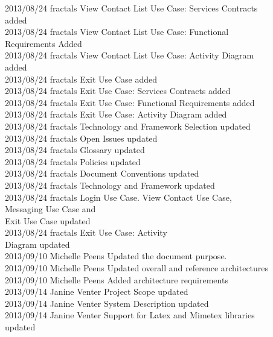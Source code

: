 \documentclass[29pt,a4paper]{moderncv}
\begin{document}
\begin{tabbing}
2013/08/24  \>fractals \> View Contact List Use Case: Services Contracts\\ \> \> \> added\\
2013/08/24  \> fractals \> View Contact List Use Case: Functional\\ \> \> \> Requirements Added\\
2013/08/24  \> fractals \> View Contact List Use Case: Activity Diagram\\ \> \> \> added\\
2013/08/24  \> fractals \> Exit Use Case added\\
2013/08/24  \> fractals \> Exit Use Case: Services Contracts added\\
2013/08/24  \> fractals \> Exit Use Case: Functional Requirements added\\
2013/08/24  \> fractals \> Exit Use Case: Activity Diagram added\\
2013/08/24  \> fractals \> Technology and Framework Selection updated\\
2013/08/24  \> fractals \> Open Issues updated\\
2013/08/24  \> fractals \> Glossary updated\\
2013/08/24  \> fractals \> Policies updated\\
2013/08/24  \> fractals \> Document Conventions updated \\
2013/08/24  \> fractals \> Technology and Framework updated\\
2013/08/24 \> fractals \> Login Use Case. View Contact Use Case,\\ \> \> \> Messaging Use Case and \\ \> \> \> Exit Use Case updated\\
2013/08/24  \> fractals \> Exit Use Case: Activity \\ \> \> \> Diagram updated\\
2013/09/10  \> Michelle Peens \> Updated the document purpose.\\
2013/09/10  \> Michelle Peens \> Updated overall and reference architectures\\
2013/09/10  \> Michelle Peens \> Added architecture requirements\\
2013/09/14  \> Janine Venter \> Project Scope updated\\
2013/09/14  \> Janine Venter \> System Description updated\\
2013/09/14  \> Janine Venter \> Support for Latex and Mimetex libraries \\ \> \> \> updated\\

\end{tabbing}
\end{document}
